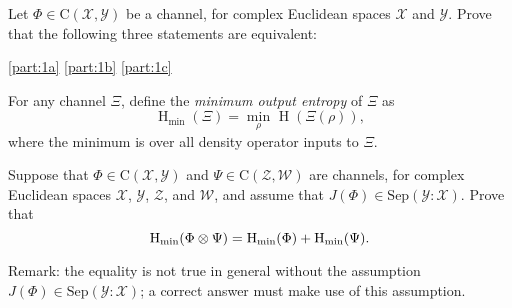 \documentclass[boxes,pages,color=SeaGreen]{homework}
\newcommand{\tinyspace}{\mspace{1mu}}
\renewcommand{\op}[1]{\operatorname{#1}}
\newcommand{\X}{\mathcal{X}}
\newcommand{\Y}{\mathcal{Y}}
\newcommand{\Z}{\mathcal{Z}}
\newcommand{\W}{\mathcal{W}}
\newcommand{\I}{\mathbb{1}}
\newcommand{\Lin}{\mathrm{L}}
\newcommand{\Pos}{\mathrm{Pos}}
\newcommand{\Density}{\mathrm{D}}
\newcommand{\Channel}{\mathrm{C}}
\newcommand{\Sep}{\mathrm{Sep}}
\newcommand{\SepD}{\mathrm{SepD}}
\begin{document}

\begin{problem}
Let $\Phi \in \Channel(\X, \Y)$ be a channel, for complex Euclidean spaces
$\X$ and $\Y$.
Prove that the following three statements are equivalent:
\end{problem}

\begin{solution}
  \ref{part:1a}
  \ref{part:1b}
  \ref{part:1c}
\end{solution}

\begin{problem}
For any channel $\Xi$, define the \emph{minimum output entropy} of $\Xi$ as
\[
  \op{H}_{\text{min}}(\Xi) = \min_{\rho} \tinyspace \op{H}(\Xi(\rho)),
\]
where the minimum is over all density operator inputs to $\Xi$.

Suppose that $\Phi\in\Channel(\X, \Y)$ and $\Psi\in\Channel(\Z, \W)$ are
channels, for complex Euclidean spaces $\X$, $\Y$, $\Z$, and $\W$, and assume
that $J(\Phi)\in\Sep(\Y \mathbin{:} \X)$.
Prove that
\[
  \op{H}_{\text{min}}(\Phi\otimes\Psi) =
  \op{H}_{\text{min}}(\Phi) + \op{H}_{\textup{min}}(\Psi).
\]

Remark: the equality is not true in general without the assumption
$J(\Phi)\in\Sep(\Y \mathbin{:} \X)$; a correct answer must make use of this
assumption.
\end{problem}
\end{document}
